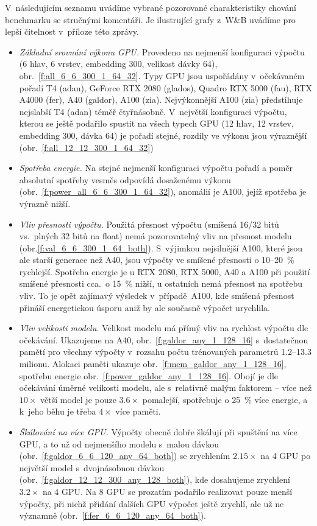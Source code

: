 \documentclass[a4paper,11pt]{article}
\begin{document}
V~následujícím seznamu uvádíme vybrané pozorované charakteristiky chování benchmarku se stručnými komentáři.
Je ilustrující grafy z~W\&B uvádíme pro lepší čitelnost v~příloze této zprávy.

\begin{itemize}
\item \emph{Základní srovnání výkonu GPU.} Provedeno na nejmenší konfiguraci
výpočtu (6 hlav, 6 vrstev, embedding 300, velikost dávky 64),
obr.~\ref{f:all_6_6_300_1_64_32}. 
Typy GPU jsou uspořádány v~očekávaném pořadí
T4 (adan), GeForce RTX 2080 (glados), Quadro RTX 5000 (fau), RTX A4000 (fer), A40
(galdor), A100 (zia).
Nejvýkonnější A100 (zia) předstihuje nejslabší T4 (adan) téměř čtyřnásobně.  
V~největší konfiguraci výpočtu, kterou se ještě podařilo spustit na všech typech GPU (12 hlav, 12 vrstev, embedding 300, dávka 64) je pořadí stejné, rozdíly ve výkonu jsou výraznější (obr.~\ref{f:all_12_12_300_1_64_32})

\item \emph{Spotřeba energie.} Na stejné nejmenší konfiguraci výpočtu pořadí a poměr absolutní spotřeby vesměs
odpovídá dosaženému výkonu (obr.~\ref{f:power_all_6_6_300_1_64_32}), anomálií je A100, jejíž spotřeba je výrazně nižší.

\item \emph{Vliv přesnosti výpočtu.} Použitá přesnost výpočtu (smíšená 16/32 bitů vs.\ plných 32 bitů na float)
nemá pozorovatelný vliv na přesnost modelu (obr.\ref{f:val_6_6_300_1_64_both}).
S~výjimkou nejsilnější A100, které jsou ale starší generace než A40, jsou výpočty ve smíšené přesnosti o 10--20~\% rychlejší.
Spotřeba energie je u RTX 2080, RTX 5000, A40 a A100 při použití smíšené přesnosti cca.\ o 15~\% nižší, u ostatních nemá
přesnost na spotřebu vliv.
To je opět zajímavý výsledek v~případě~A100, kde smíšená přesnost přináší energetickou úsporu aniž by ale současně
výpočet urychlila.

\item \emph{Vliv velikosti modelu.}
Velikost modelu má přímý vliv na rychlost výpočtu dle očekávání. Ukazujeme na A40, obr.~\ref{f:galdor_any_1_128_16}
s~dostatečnou pamětí pro všechny výpočty v~rozsahu počtu trénovaných parametrů 1.2--13.3 milionu.
Alokaci paměti ukazuje obr.~\ref{f:mem_galdor_any_1_128_16}, spotřebu energie obr.~\ref{f:power_galdor_any_1_128_16}.
Obojí je dle očekávání úměrné velikosti modelu, ale s~relativně malým faktorem -- více než $10\times$ větší model je pouze
$3.6\times$ pomalejší, spotřebuje o 25~\% více energie, a k~jeho běhu je třeba $4\times$ více paměti.

\item \emph{Škálování na více GPU.}
Výpočty obecně dobře škálují při spuštění na více GPU, a to už od nejmenšího modelu s~malou dávkou (obr.~\ref{f:galdor_6_6_120_any_64_both}) se zrychlením $2.15\times$ na 4 GPU
po největší model s~dvojnásobnou dávkou (obr.~\ref{f:galdor_12_12_300_any_128_both}), kde dosahujeme zrychlení $3.2\times$ na 4 GPU.
Na 8 GPU se prozatím podařilo realizovat pouze menší výpočty, při nichž přidání dalších GPU výpočet ještě zrychlí,
ale už ne významně (obr.~\ref{f:fer_6_6_120_any_64_both}).
\end{itemize}
\end{document}
